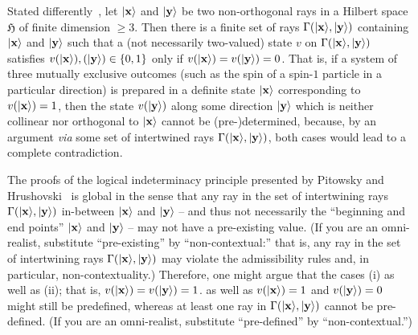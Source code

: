 \documentclass[%
  twocolumn,
 showpacs,
 showkeys,
 preprintnumbers,
 amsmath,amssymb,
 aps,
  pra,
  longbibliography,
 floatfix,
 ]{revtex4-1}
\begin{document}
Stated differently~\cite[Theorem~2,p~183]{hru-pit-2003},
let $\vert {\bf x} \rangle$
and
$\vert {\bf y} \rangle$
be two non-orthogonal rays in a Hilbert space $\mathfrak{H}$ of finite
dimension $\ge 3$. Then there is a finite set of rays $\Gamma ( \vert {\bf x} \rangle , \vert {\bf y} \rangle )$ containing
$\vert {\bf x} \rangle$
and
$\vert {\bf y} \rangle$
such that a (not necessarily two-valued)
state $v$ on $\Gamma ( \vert {\bf x} \rangle , \vert {\bf y} \rangle )$
satisfies $v ( \vert {\bf x} \rangle ),( \vert {\bf y} \rangle ) \in \{0,1\}$
only if $v ( \vert {\bf x} \rangle ) = v ( \vert {\bf y} \rangle ) =0$.
That is,
if a system of three mutually exclusive outcomes (such as the spin of a spin-$1$ particle in a particular direction)
is prepared in a definite state $\vert {\bf x} \rangle$  corresponding to $v(\vert {\bf x} \rangle )=1$,
then the state $ v ( \vert {\bf y} \rangle ) $ along  some direction $\vert {\bf y} \rangle $ which is neither collinear nor orthogonal
to  $\vert {\bf x} \rangle$
cannot be (pre-)determined,
because, by an argument {\it via} some set of intertwined rays  $\Gamma ( \vert {\bf x} \rangle , \vert {\bf y} \rangle )$,
both cases would lead to a complete contradiction.

The proofs of the logical indeterminacy principle
presented by  Pitowsky and Hrushovski~\cite{pitowsky:218,hru-pit-2003}
is global in the sense that any ray in the
set of intertwining rays $\Gamma ( \vert {\bf x} \rangle , \vert {\bf y} \rangle )$
in-between  $\vert {\bf x} \rangle$
and
$\vert {\bf y} \rangle$  -- and thus not necessarily the ``beginning and end points''
$\vert {\bf x} \rangle$
and
$\vert {\bf y} \rangle$
--
may not have a pre-existing value.
(If you are an omni-realist, substitute ``pre-existing'' by ``non-contextual:''
that is, any ray in the
set of intertwining rays $\Gamma ( \vert {\bf x} \rangle , \vert {\bf y} \rangle )$
may violate the admissibility rules and, in particular, non-contextuality.)
Therefore, one might argue that the cases
(i) as well as (ii); that is,
$v ( \vert {\bf x} \rangle ) = v ( \vert {\bf y} \rangle ) =1$.
as well as
$v ( \vert {\bf x} \rangle ) = 1$ and $ v ( \vert {\bf y} \rangle ) =0$
might still be predefined, whereas at least one ray in $\Gamma ( \vert {\bf x} \rangle , \vert {\bf y} \rangle )$ cannot be pre-defined.
(If you are an omni-realist, substitute ``pre-defined'' by ``non-contextual.'')
\end{document}
